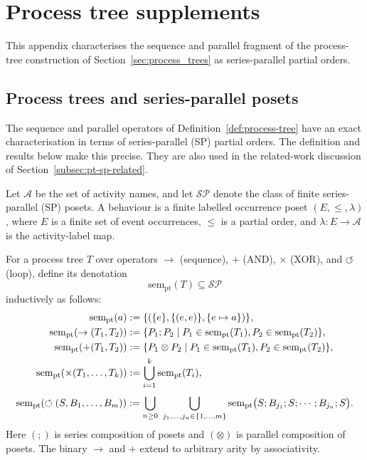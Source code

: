 \section{Process tree supplements}\label{sec:pt-extras}

This appendix characterises the sequence and parallel fragment of the process-tree construction of
Section~\ref{sec:process_trees} as series-parallel partial orders.

\subsection{Process trees and series-parallel posets}\label{subsec:pt-sp-appendix}

The sequence and parallel operators of Definition~\ref{def:process-tree} have an exact
characterisation in terms of series-parallel (SP) partial orders.
The definition and results below make this precise. They are also used in the
related-work discussion of Section~\ref{subsec:pt-sp-related}.

\begin{definition}\label{def:pt-occ-semantics}
  Let $\mathcal{A}$ be the set of activity names, and let $\mathcal{SP}$ denote the class of finite series-parallel (SP) posets.
  A behaviour is a finite labelled occurrence poset $(E,\leq,\lambda)$, where $E$ is a finite set of event occurrences, $\leq$ is a partial order, and $\lambda:E\to\mathcal{A}$ is the activity-label map.

  For a process tree $T$ over operators $\to$ (sequence), $+$ (AND), $\times$ (XOR), and $\circlearrowleft$ (loop), define its denotation
  \[
    \mathrm{sem}_{\mathrm{pt}}(T) \subseteq \mathcal{SP}
  \]
  inductively as follows:
  \begin{align*}
    \mathrm{sem}_{\mathrm{pt}}(a)
    &:= \{(\{e\},\{(e,e)\},\{e\mapsto a\})\},\\
    \mathrm{sem}_{\mathrm{pt}}(\to(T_1,T_2))
    &:= \{P_1;P_2 \mid P_1\in\mathrm{sem}_{\mathrm{pt}}(T_1), P_2\in\mathrm{sem}_{\mathrm{pt}}(T_2)\},\\
    \mathrm{sem}_{\mathrm{pt}}(+(T_1,T_2))
    &:= \{P_1\otimes P_2 \mid P_1\in\mathrm{sem}_{\mathrm{pt}}(T_1), P_2\in\mathrm{sem}_{\mathrm{pt}}(T_2)\},\\
    \mathrm{sem}_{\mathrm{pt}}(\times(T_1,\dots,T_k))
    &:= \bigcup_{i=1}^k \mathrm{sem}_{\mathrm{pt}}(T_i),
  \end{align*}
  \begin{gather*}
    \mathrm{sem}_{\mathrm{pt}}(\circlearrowleft(S,B_1,\dots,B_m)) :=\twocolbreak 
    \bigcup_{n\ge 0}\ \bigcup_{j_1,\dots,j_n\in\{1,\dots,m\}}\twocolbreak 
    \mathrm{sem}_{\mathrm{pt}}\bigl(S;B_{j_1};S;\cdots;B_{j_n};S\bigr).
  \end{gather*}
  Here $(;)$ is series composition of posets and $(\otimes)$ is parallel composition of posets.
  The binary $\to$ and $+$ extend to arbitrary arity by associativity.
\end{definition}

